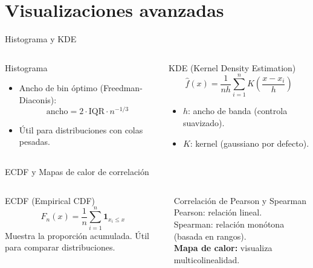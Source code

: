 \documentclass[aspectratio=169, 10pt, xcolor=table]{beamer}
\begin{document}
\section{Visualizaciones avanzadas}

\begin{frame}{Histograma y KDE}
    \begin{columns}[t]
        \begin{block}{Histograma}
            \begin{itemize}
                \item Ancho de bin óptimo (Freedman-Diaconis): 
                \[
                \text{ancho} = 2 \cdot \text{IQR} \cdot n^{-1/3}
                \]
                \item Útil para distribuciones con colas pesadas.
            \end{itemize}
        \end{block}
        \begin{block}{KDE (Kernel Density Estimation)}
            \[
            \hat{f}(x) = \frac{1}{nh}\sum_{i=1}^n K\left(\frac{x-x_i}{h}\right)
            \]
            \begin{itemize}
                \item $h$: ancho de banda (controla suavizado).
                \item $K$: kernel (gaussiano por defecto).
            \end{itemize}
        \end{block}
    \end{columns}
\end{frame}

\begin{frame}{ECDF y Mapas de calor de correlación}
    \begin{columns}[t]
        \begin{block}{ECDF (Empirical CDF)}
            \[
            F_n(x) = \frac{1}{n}\sum_{i=1}^n \mathbf{1}_{x_i \le x}
            \]
            Muestra la proporción acumulada. Útil para comparar distribuciones.
        \end{block}
        \begin{block}{Correlación de Pearson y Spearman}
            Pearson: relación lineal. \\
            Spearman: relación monótona (basada en rangos). \\
            \vspace{0.2cm}
            \textbf{Mapa de calor:} visualiza multicolinealidad.
        \end{block}
    \end{columns}
\end{frame}
\end{document}
